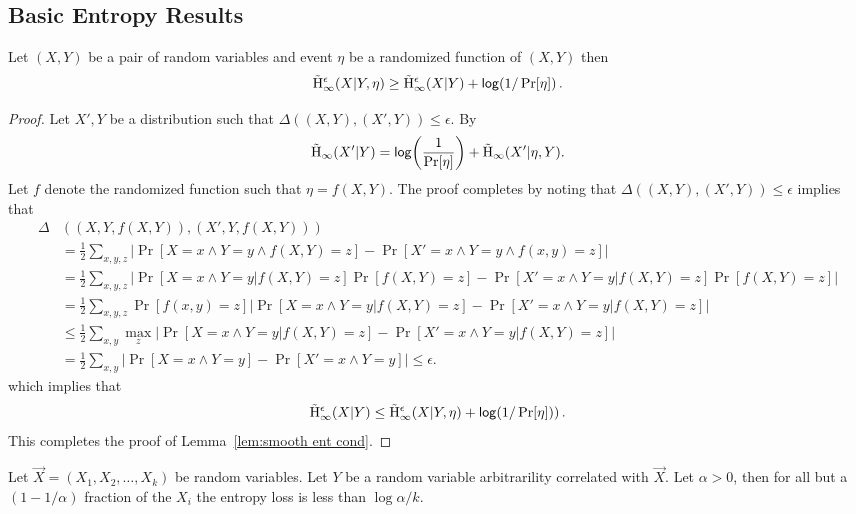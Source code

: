 \subsection{Basic Entropy Results}
\begin{lemma}
Let $(X, Y)$ be a pair of random variables and event $\eta$ be a randomized function of $(X, Y)$ then 
\[
\tilde{\mathrm{H}}_\infty^\epsilon(X|Y, \eta)\ge \tilde{\mathrm{H}}_\infty^\epsilon(X|Y) + \mathsf{log}\!\left( 1/\Pr[\eta]\right).
\]
\label{lem:smooth ent cond}
\end{lemma}
\begin{proof}
Let $X', Y$ be a distribution such that $\Delta((X, Y), (X', Y)) \le \epsilon$.  By \cite[Lemma 7.8]{fuller2020fuzzy} 
\begin{align*}
\tilde{\mathrm{H}}_\infty(X' | Y) =\mathsf{log}\!\left(\frac{1}{\Pr[\eta]}\right)+\tilde{\mathrm{H}}_\infty(X'| \eta, Y).
\end{align*}
Let $f$ denote the randomized function such that $\eta = f(X, Y)$.    
The proof completes by noting that $\Delta((X, Y), (X', Y))\le \epsilon$ implies that 
\begin{align*}
\Delta&((X, Y, f(X, Y)), (X', Y, f(X, Y)))\\ &=\frac{1}{2}\sum_{x, y, z} \left| \Pr[X =x \wedge Y=y \wedge f(X, Y) = z] - \Pr[X'=x \wedge Y=y \wedge f(x, y) = z]\right|\\
&=\frac{1}{2}\sum_{x, y, z} \left| \Pr[X =x \wedge Y=y | f(X, Y) = z]\Pr[f(X,Y) =z] - \Pr[X'=x \wedge Y=y | f(X, Y) = z]\Pr[f(X,Y)=z]\right|\\
&=\frac{1}{2}\sum_{x, y, z} \Pr[f(x,y)=z]\left| \Pr[X =x \wedge Y=y | f(X, Y) = z] - \Pr[X'=x \wedge Y=y | f(X, Y) = z]\right|\\
&\le \frac{1}{2}\sum_{x, y} \max_{z}\left| \Pr[X =x \wedge Y=y | f(X, Y) = z] - \Pr[X'=x \wedge Y=y | f(X, Y) = z]\right|\\
&=\frac{1}{2}\sum_{x, y} \left| \Pr[X =x \wedge Y=y ] - \Pr[X'=x \wedge Y=y ]\right|\le \epsilon.
\end{align*}  which implies that 
\[
\tilde{\mathrm{H}}_\infty^\epsilon(X| Y) \le \tilde{\mathrm{H}}_\infty^\epsilon(X|Y, \eta) +\mathsf{log}\!\left(1/\Pr[\eta])\right).
\]
This completes the proof of Lemma~\ref{lem:smooth ent cond}.
\end{proof}


\begin{lemma}{\cite[Lemma 2.2a]{dodis2008fuzzy}}
    \label{lem:markovpred}
    Let $\vec{X} = (X_1, X_2, \ldots, X_k)$ be random variables. Let $Y$ be a random variable arbitrarility correlated with $\vec{X}$. 
    Let $\alpha > 0$, then for all but a $(1-1/\alpha)$ fraction of the $X_i$ the entropy loss is less than $\log{\alpha}/k$. 
\end{lemma}


